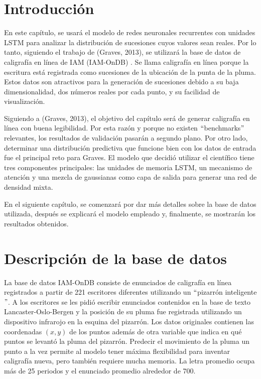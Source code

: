 \section{Introducción}
En este capítulo, se usará el modelo de redes neuronales recurrentes con unidades LSTM para analizar la distribución de sucesiones cuyos valores sean reales. Por lo tanto, siguiendo el trabajo de (Graves, 2013), se utilizará la base de datos de caligrafía en línea de IAM (IAM-OnDB) \cite{handwriting}. 
Se llama caligrafía en línea porque la escritura está registrada como sucesiones de la ubicación de la punta de la pluma. Estos datos son atractivos para la generación de sucesiones debido a su baja dimensionalidad, dos números reales por cada punto, y su facilidad de visualización. 
\cite{handwriting}
\cite{DBLP:journals/corr/Graves13}


\vspace{1em}

Siguiendo a (Graves, 2013), el objetivo del capítulo será de generar caligrafía en línea con buena legibilidad. Por esta razón y porque no existen $``$benchmarks$"$ relevantes, los resultados de validación pasarán a segundo plano. Por otro lado, determinar una distribución predictiva que funcione bien con los datos de entrada fue el principal reto para Graves. El modelo que decidió utilizar el científico tiene tres componentes principales: las unidades de memoria LSTM, un mecanismo de atención y una mezcla de gaussianas como capa de salida para generar una red de densidad mixta. 

\vspace{1em}

En el siguiente capítulo, se comenzará por dar más detalles sobre la base de datos utilizada, después se explicará el modelo empleado y, finalmente, se mostrarán los resultados obtenidos.


\section{Descripción de la base de datos}
La base de datos IAM-OnDB consiste de enunciados de caligrafía en línea registrados a partir de 221 escritores diferentes utilizando un $``$pizarrón inteligente$"$. A los escritores se les pidió escribir enunciados contenidos en la base de texto Lancaster-Oslo-Bergen y la posición de su pluma fue registrada utilizando un dispositivo infrarojo en la esquina del pizarrón. Los datos originales contienen las coordenadas $(x,y)$ de los puntos además de otra variable que indica en qué puntos se levantó la pluma del pizarrón. Predecir el movimiento de la pluma un punto a la vez permite al modelo tener máxima flexibilidad para inventar caligrafía nueva, pero también requiere mucha memoria. La letra promedio ocupa más de 25 periodos y el enunciado promedio alrededor de 700.
\cite{DBLP:journals/corr/Graves13}

